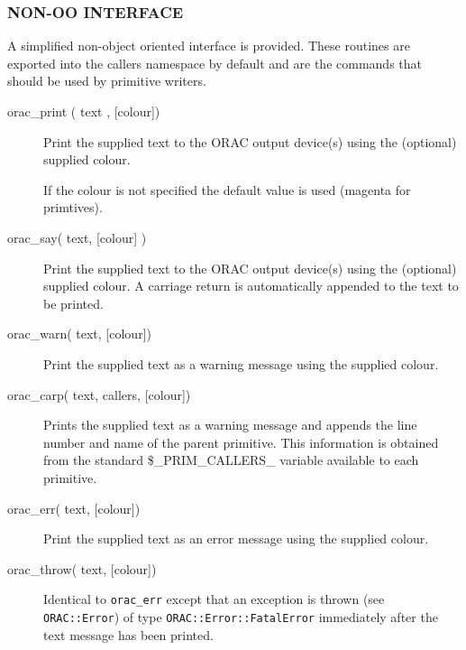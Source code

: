 \begin{description}
\subsubsection*{NON-OO INTERFACE\label{ORAC::Print_NON-OO_INTERFACE}}


A simplified non-object oriented interface is provided.
These routines are exported into the callers namespace by default
and are the commands that should be used by primitive writers.

\begin{description}

\item[{orac\_print ( text , [colour])}] \mbox{}

Print the supplied text to the ORAC output device(s)
using the (optional) supplied colour.



If the colour is not specified the default value is used (magenta
for primtives).


\item[{orac\_say( text, [colour] )}] \mbox{}

Print the supplied text to the ORAC output device(s) using the (optional) supplied colour. A carriage return is automatically appended to the text to be printed.


\item[{orac\_warn( text, [colour])}] \mbox{}

Print the supplied text as a warning message using the supplied
colour.


\item[{orac\_carp( text, callers, [colour])}] \mbox{}

Prints the supplied text as a warning message and appends the line number
and name of the parent primitive. This information is obtained from the
standard \$\_PRIM\_CALLERS\_ variable available to each primitive.


\item[{orac\_err( text, [colour])}] \mbox{}

Print the supplied text as an error message using the supplied
colour.


\item[{orac\_throw( text, [colour])}] \mbox{}

Identical to \texttt{orac\_err} except that an exception is thrown (see
\texttt{ORAC::Error}) of type \texttt{ORAC::Error::FatalError} immediately after
the text message has been printed.



\end{description}
\end{description}
